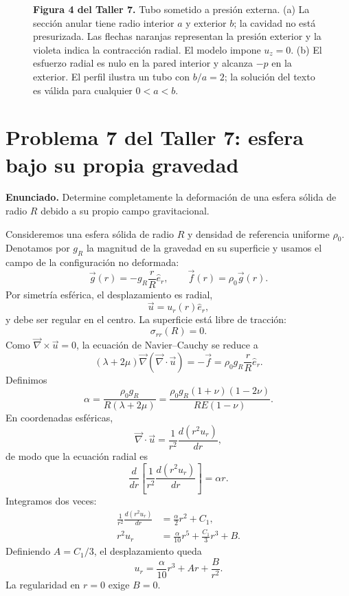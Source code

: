 \begin{figure}[H]
\centering

\par\medskip
\begin{minipage}{\textwidth}
\textbf{Figura 4 del Taller 7.} Tubo sometido a presión externa. (a) La sección anular tiene radio interior $a$ y exterior $b$; la cavidad no está presurizada. Las flechas naranjas representan la presión exterior y la violeta indica la contracción radial. El modelo impone $u_z=0$. (b) El esfuerzo radial es nulo en la pared interior y alcanza $-p$ en la exterior. El perfil ilustra un tubo con $b/a=2$; la solución del texto es válida para cualquier $0<a<b$.
\end{minipage}
\end{figure}

\section{Problema 7 del Taller 7: esfera bajo su propia gravedad}

\textbf{Enunciado.} Determine completamente la deformación de una esfera sólida de radio $R$ debido a su propio campo gravitacional.

Consideremos una esfera sólida de radio $R$ y densidad de referencia uniforme $\rho_0$. Denotamos por $g_R$ la magnitud de la gravedad en su superficie y usamos el campo de la configuración no deformada:
\[
\vec g(r)=-g_R\frac{r}{R}\hat e_r,
\qquad
\vec f(r)=\rho_0\vec g(r).
\]
Por simetría esférica, el desplazamiento es radial,
\[
\vec u=u_r(r)\hat e_r,
\]
y debe ser regular en el centro. La superficie está libre de tracción:
\[
\sigma_{rr}(R)=0.
\]
Como $\vec\nabla\times\vec u=0$, la ecuación de Navier--Cauchy se reduce a
\[
(\lambda+2\mu)\vec\nabla(\vec\nabla\cdot\vec u)
=-\vec f
=\rho_0g_R\frac{r}{R}\hat e_r.
\]
Definimos
\[
\alpha=\frac{\rho_0g_R}{R(\lambda+2\mu)}
=\frac{\rho_0g_R(1+\nu)(1-2\nu)}{RE(1-\nu)}.
\]
En coordenadas esféricas,
\[
\vec\nabla\cdot\vec u=\frac{1}{r^2}\frac{d(r^2u_r)}{dr},
\]
de modo que la ecuación radial es
\[
\frac{d}{dr}\left[\frac{1}{r^2}\frac{d(r^2u_r)}{dr}\right]=\alpha r.
\]
Integramos dos veces:
\[
\begin{aligned}
\frac{1}{r^2}\frac{d(r^2u_r)}{dr}
&=\frac{\alpha}{2}r^2+C_1,\\
r^2u_r&=\frac{\alpha}{10}r^5+\frac{C_1}{3}r^3+B.
\end{aligned}
\]
Definiendo $A=C_1/3$, el desplazamiento queda
\[
u_r=\frac{\alpha}{10}r^3+Ar+\frac{B}{r^2}.
\]
La regularidad en $r=0$ exige $B=0$.

